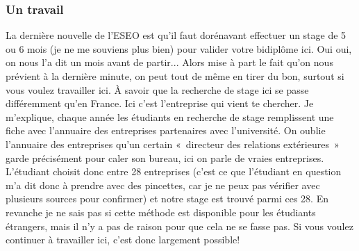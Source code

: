 \subsubsection{Un travail}\label{sec:sec4.7.2.2}
La dernière nouvelle de l’ESEO est qu’il faut dorénavant effectuer un stage de 5 ou 6 mois (je ne me souviens plus bien) pour valider votre bidiplôme ici. Oui oui, on nous l’a dit un mois avant de partir...
Alors mise à part le fait qu’on nous prévient à la dernière minute, on peut tout de même en tirer du bon, surtout si vous voulez travailler ici.
À savoir que la recherche de stage ici se passe différemment qu’en France. Ici c’est l’entreprise qui vient te chercher. Je m’explique, chaque année les étudiants en recherche de stage remplissent une fiche avec l’annuaire des entreprises partenaires avec l’université. On oublie l’annuaire des entreprises qu’un certain « directeur des relations extérieures » garde précisément pour caler son bureau, ici on parle de vraies entreprises. L’étudiant choisit donc entre 28 entreprises (c’est ce que l’étudiant en question m’a dit donc à prendre avec des pincettes, car je ne peux pas vérifier avec plusieurs sources pour confirmer) et notre stage est trouvé parmi ces 28. En revanche je ne sais pas si cette méthode est disponible pour les étudiants étrangers, mais il n’y a pas de raison pour que cela ne se fasse pas. Si vous voulez continuer à travailler ici, c’est donc largement possible!
